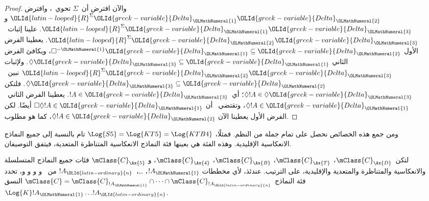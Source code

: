 \documentclass[../../../include/open-logic-section]{subfiles}
\begin{document}
\begin{proof}
  والآن افترض أن~$\Sigma$ تحوي~، وافترض
  ${\OLId{latin-looped}{R}}^\Sigma {\OLId{greek-variable}{Delta}}_{\OLMathNumeral{1}}{\OLId{greek-variable}{Delta}}_{\OLMathNumeral{2}}$ و${\OLId{latin-looped}{R}}^\Sigma {\OLId{greek-variable}{Delta}}_{\OLMathNumeral{1}}{\OLId{greek-variable}{Delta}}_{\OLMathNumeral{3}}$.
  علينا إثبات~${\OLId{latin-looped}{R}}^\Sigma {\OLId{greek-variable}{Delta}}_{\OLMathNumeral{2}}{\OLId{greek-variable}{Delta}}_{\OLMathNumeral{3}}$. يعطينا الفرض الأول
  $\Box^{-{\OLMathNumeral{1}}}{\OLId{greek-variable}{Delta}}_{\OLMathNumeral{1}} \subseteq {\OLId{greek-variable}{Delta}}_{\OLMathNumeral{2}}$، ويكافئ الفرض الثاني
  $\Diamond{\OLId{greek-variable}{Delta}}_{\OLMathNumeral{3}} \subseteq {\OLId{greek-variable}{Delta}}_{\OLMathNumeral{1}}$. ولإثبات
  ${\OLId{latin-looped}{R}}^\Sigma {\OLId{greek-variable}{Delta}}_{\OLMathNumeral{2}}{\OLId{greek-variable}{Delta}}_{\OLMathNumeral{3}}$
  نبين~$\Diamond{\OLId{greek-variable}{Delta}}_{\OLMathNumeral{3}} \subseteq {\OLId{greek-variable}{Delta}}_{\OLMathNumeral{2}}$. فلتكن
  $\Diamond!A \in \Diamond{\OLId{greek-variable}{Delta}}_{\OLMathNumeral{3}}$؛ أي~$!A \in {\OLId{greek-variable}{Delta}}_{\OLMathNumeral{3}}$. يعطينا
  الفرض الثاني~$\Diamond!A \in {\OLId{greek-variable}{Delta}}_{\OLMathNumeral{1}}$، وتقتضي~ أن
  $\Box\Diamond!A \in {\OLId{greek-variable}{Delta}}_{\OLMathNumeral{1}}$ أيضًا. لكن الفرض الأول يعطينا الآن
  $\Diamond!A \in {\OLId{greek-variable}{Delta}}_{\OLMathNumeral{2}}$، كما هو مطلوب.
\end{proof}

ومن جمع هذه الخصائص نحصل على تمام جملة من النظم.
فمثلًا، $ \Log{S5} = \Log{KT5} = \Log{KTB4}$
تام بالنسبة إلى جميع النماذج الانعكاسية الإقليدية.
وهذه الفئة هي بعينها فئة النماذج الانعكاسية المتناظرة المتعدية،
فيتفق التوصيفان.

\begin{thm}
  لتكن~$\mClass{C}_\Ax{D}$، $\mClass{C}_\Ax{T}$،
  $\mClass{C}_\Ax{B}$، $\mClass{C}_\Ax{4}$، و
  $\mClass{C}_\Ax{5}$ فئات جميع النماذج المتسلسلة والانعكاسية
  والمتناظرة والمتعدية والإقليدية، على الترتيب. عندئذ، لأي مخططات
  $!A_{\OLMathNumeral{1}}$، \dots،~$!A_{\OLId{latin-ordinary}{n}}$ من~ و و و و،
  تحدد فئة النماذج
  $\mClass{C} = \mClass{C}_{!A_{\OLMathNumeral{1}}} \cap \dots
  \cap \mClass{C}_{!A_{\OLId{latin-ordinary}{n}}}$ النسق~$\Log{K}!A_{\OLMathNumeral{1}} \dots !A_{\OLId{latin-ordinary}{n}}$.
\end{thm}
\end{document}
